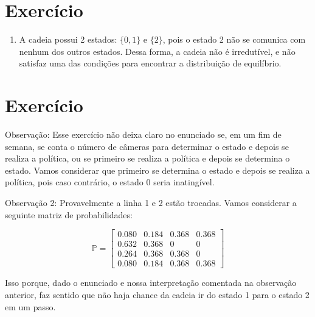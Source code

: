 \documentclass{article}
\begin{document}
\section{Exercício}

\begin{enumerate}
    \item[] A cadeia possui 2 estados: $\{0,1\}$ e $\{2\}$, pois o estado 2 não se comunica com nenhum dos outros estados. Dessa forma, a cadeia não é irredutível, e não satisfaz uma das condições para encontrar a distribuição de equilíbrio.

\end{enumerate}

\section{Exercício}

Observação: Esse exercício não deixa claro no enunciado se, em um fim de semana, se conta o número de câmeras para determinar o estado e depois se realiza a política, ou se primeiro se realiza a política e depois se determina o estado. Vamos considerar que primeiro se determina o estado e depois se realiza a política, pois caso contrário, o estado 0 seria inatingível.

Observação 2: Provavelmente a linha 1 e 2 estão trocadas. Vamos considerar a seguinte matriz de probabilidades:

$$\mathbb{P}=\begin{bmatrix}
    0.080 & 0.184 & 0.368 & 0.368\\
    0.632 & 0.368 & 0 & 0\\
    0.264 & 0.368 & 0.368 & 0\\
    0.080 & 0.184 & 0.368 & 0.368
\end{bmatrix}$$

Isso porque, dado o enunciado e nossa interpretação comentada na observação anterior, faz sentido que não haja chance da cadeia ir do estado 1 para o estado 2 em um passo. 

\newpage
\end{document}
